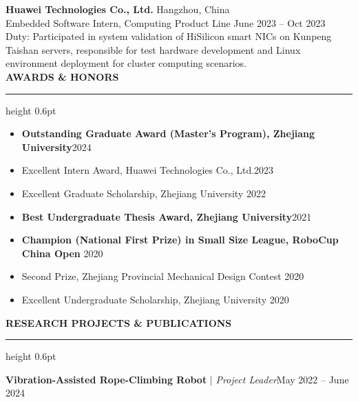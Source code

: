 \documentclass[10pt,a4paper]{article}
\renewcommand{\section}[1]{
    \vspace{8pt}
    \noindent\textbf{\large\rmfamily\textcolor{sectionblue}{\MakeUppercase{#1}}}
    \vspace{4pt}
    \hrule height 0.6pt
    \vspace{8pt}
}
\begin{document}
\noindent
\textbf{Huawei Technologies Co., Ltd.} \hfill Hangzhou, China \\
Embedded Software Intern, Computing Product Line \hfill June 2023 -- Oct 2023 \\
Duty: Participated in system validation of HiSilicon smart NICs on Kunpeng Taishan servers, responsible for test hardware development and Linux environment deployment for cluster computing scenarios.\\

\section{Awards \& Honors}
\begin{itemize}
    \item \textbf{Outstanding Graduate Award (Master's Program), Zhejiang University}\hfill 2024
    \item Excellent Intern Award, Huawei Technologies Co., Ltd.\hfill 2023
    \item Excellent Graduate Scholarship, Zhejiang University \hfill 2022
    \item \textbf{Best Undergraduate Thesis Award, Zhejiang University}\hfill 2021
    \item \textbf{Champion (National First Prize) in Small Size League, RoboCup China Open }\hfill 2020
    \item Second Prize, Zhejiang Provincial Mechanical Design Contest \hfill 2020
    \item Excellent Undergraduate  Scholarship, Zhejiang University \hfill 2020
\end{itemize}
\vspace{6pt}
\section{Research Projects \& Publications}
\noindent
\textbf{Vibration-Assisted Rope-Climbing Robot} $\vert$ \textit{Project Leader}\hfill May 2022 -- June 2024
\end{document}
